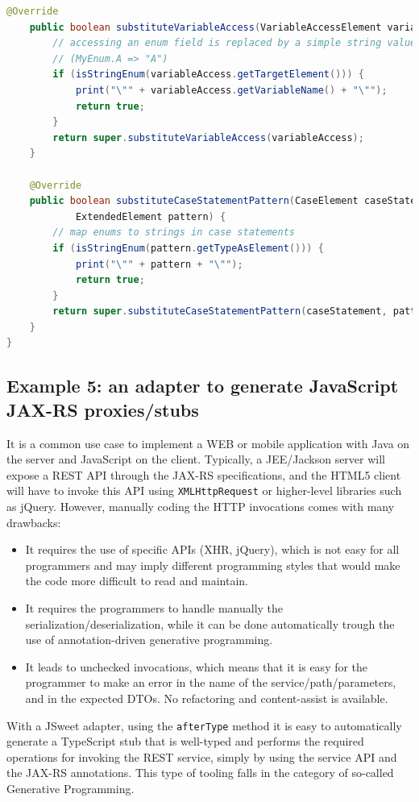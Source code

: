 \documentclass[a4paper]{report}
\begin{document}
\begin{lstlisting}[language=Java]
	@Override
	public boolean substituteVariableAccess(VariableAccessElement variableAccess) {
		// accessing an enum field is replaced by a simple string value
		// (MyEnum.A => "A")
		if (isStringEnum(variableAccess.getTargetElement())) {
			print("\"" + variableAccess.getVariableName() + "\"");
			return true;
		}
		return super.substituteVariableAccess(variableAccess);
	}

	@Override
	public boolean substituteCaseStatementPattern(CaseElement caseStatement, 
			ExtendedElement pattern) {
		// map enums to strings in case statements
		if (isStringEnum(pattern.getTypeAsElement())) {
			print("\"" + pattern + "\"");
			return true;
		}
		return super.substituteCaseStatementPattern(caseStatement, pattern);
	}
}
\end{lstlisting}

\subsection{Example 5: an adapter to generate JavaScript JAX-RS proxies/stubs}

It is a common use case to implement a WEB or mobile application with Java on the server and JavaScript on the client. Typically, a JEE/Jackson server will expose a REST API through the JAX-RS specifications, and the HTML5 client will have to invoke this API using \texttt{XMLHttpRequest} or higher-level libraries such as jQuery. However, manually coding the HTTP invocations comes with many drawbacks:

\begin{itemize}
\item It requires the use of specific APIs (XHR, jQuery), which is not easy for all programmers and may imply different programming styles that would make the code more difficult to read and maintain.
\item It requires the programmers to handle manually the serialization/deserialization, while it can be done automatically trough the use of annotation-driven generative programming.
\item It leads to unchecked invocations, which means that it is easy for the programmer to make an error in the name of the service/path/parameters, and in the expected DTOs. No refactoring and content-assist is available.
\end{itemize}

With a JSweet adapter, using the \texttt{afterType} method it is easy to automatically generate a TypeScript stub that is well-typed and performs the required operations for invoking the REST service, simply by using the service API and the JAX-RS annotations. This type of tooling falls in the category of so-called Generative Programming. 
\end{document}
